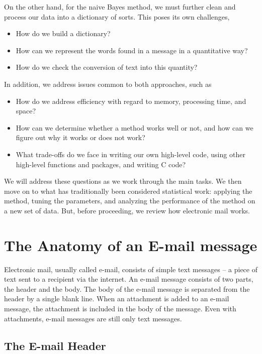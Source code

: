 On the other hand, for the naive Bayes method, we must further
clean and process our data into a dictionary of sorts. This 
poses its own challenges, 

\begin{itemize}
    \item How do we build a dictionary?
    \item How can we represent the words found in a message in a 
    quantitative way?
    \item How do we check the conversion of text into this quantity?
\end{itemize}

In addition, we address issues common to both approaches, such as 

\begin{itemize}
  \item How do we address efficiency with regard to memory, 
  processing time, and space?
  \item How can we determine whether a method works well or not, and 
  how can we figure out why it works or does not work?
  \item What trade-offs do we face in writing our own high-level code, 
   using other high-level functions and packages, and writing C code?
\end{itemize}

We will address these questions as we work through the main tasks.
We then move on to what has traditionally been considered statistical
work: applying the method, tuning the parameters, and analyzing the
performance of the method on a new set of data.
But, before proceeding, we review how electronic mail works.

\section{The Anatomy of an E-mail message}

Electronic mail, usually called e-mail, consists of simple text
messages -- a piece of text sent to a recipient via the internet.  An
e-mail message consists of two parts, the header and the body.  The
body of the e-mail message is separated from the header by a single
blank line.  When an attachment is added to an e-mail message, the
attachment is included in the body of the message.  Even with
attachments, e-mail messages are still only text messages.

\subsection{The E-mail Header}

